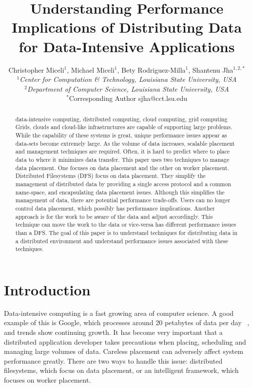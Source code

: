 \documentclass{rspublic}
\title[Understanding Performance Implications of Distributing Data for
Data-Intensive Applications]{Understanding Performance Implications of
Distributing Data for Data-Intensive Applications}
\author[Miceli, Miceli, Rodriguez-Milla, Jha]{ Christopher Miceli$^{1}$,
Michael Miceli$^{1}$, Bety Rodriguez-Milla$^{1}$, Shantenu Jha$^{1,2,*}$
\\ \small{\emph{$^{1}$Center for Computation \& Technology, Louisiana
State University, USA}} \\  \small{\emph{$^{2}$Department of Computer
Science, Louisiana State University, USA}} \\ {\footnotesize
{\hspace{0.0 in} $^*$Corresponding Author sjha@cct.lsu.edu}} }
\begin{document}
 \maketitle


\begin{abstract}{data-intensive computing, distributed computing, cloud
computing, grid computing} Grids, clouds and cloud-like infrastructures
are capable of supporting large problems.  While the capability of these
systems is great, unique performance issues appear as data-sets become
extremely large.  As the volume of data increases, scalable placement
and management techniques are required.  Often, it is hard to predict
where to place data to where it minimizes data transfer.  This paper
uses two techniques to manage data placement.  One focuses on data
placement and the other on worker placement.  Distributed Filesystems
(DFS) focus on data placement.  They simplify the management of
distributed data by providing a single access protocol and a common
name-space, and encapsulating data placement issues.  Although this
simplifies the management of data, there are potential performance
trade-offs.  Users can no longer control data placement, which possibly
has performance implications.  Another approach is for the work to be
aware of the data and adjust accordingly. This technique can move the
work to the data or vice-versa has different performance issues than a
DFS.  The goal of this paper is to understand techniques for
distributing data in a distributed environment and understand
performance issues associated with these techniques.\end{abstract}

\section{Introduction} Data-intensive computing is a fast growing area
of computer science.  A good example of this is Google, which processes
around 20 petabytes of data per day ~\citep{google}, and trends show
continuing growth.  It has become very important that a distributed
application developer takes precautions when placing, scheduling and
managing large volumes of data.  Careless placement can adversely affect
system performance greatly.  There are two ways to handle this issue:
distributed filesystems, which focus on data placement, or an
intelligent framework, which focuses on worker placement.
\end{document}
